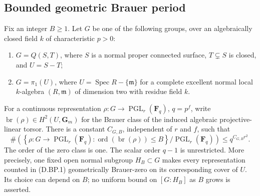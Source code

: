 \subsection{Bounded geometric Brauer period}

\begin{theorem}
\label{D:bounded-geometric-Brauer-period}
Fix an integer $B\ge1$.  Let $G$ be one of the following groups,
over an algebraically closed field $k$ of characteristic $p>0$:
\begin{enumerate}
\item $G=Q(S,T)$, where $S$ is a normal proper connected surface,
      $T\subsetneq S$ is closed, and $U=S-T$;
\item $G=\pi_1(U)$, where
      $U=\operatorname{Spec}R-\{\mathfrak m\}$ for a complete
      excellent normal local $k$-algebra $(R,\mathfrak m)$ of
      dimension two with residue field $k$.
\end{enumerate}
For a continuous representation
$\rho:G\to\operatorname{PGL}_r(\mathbf F_q)$, $q=p^f$,
write $\operatorname{br}(\rho)\in H^2(U,\mathbf G_m)$
for the Brauer class of the induced algebraic projective-linear
torsor.  There is a constant $C_{G,B}$, independent of $r$ and $f$,
such that
\[
 \#\left(
  \left\{\rho:G\to\operatorname{PGL}_r(\mathbf F_q):
       \operatorname{ord}(\operatorname{br}(\rho))\le B\right\}
        /\operatorname{PGL}_r(\mathbf F_q)\right)
       \le q^{C_{G,B}r^2}.                         \tag{D.BP.1}
\]
The order of the zero class is one.  The scalar order $q-1$
is unrestricted.  More precisely, one fixed open normal
subgroup $H_B\subset G$ makes every representation counted
in (D.BP.1) geometrically Brauer-zero on its corresponding
cover of $U$.  Its choice can depend on $B$; no uniform
bound on $[G:H_B]$ as $B$ grows is asserted.
\end{theorem}

